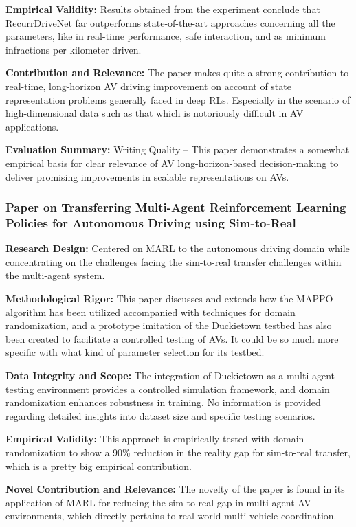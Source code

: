 \documentclass[lettersize,journal]{IEEEtran}
\begin{document}
\textbf{Empirical Validity:} Results obtained from the experiment conclude that RecurrDriveNet far outperforms state-of-the-art approaches concerning all the parameters, like in real-time performance, safe interaction, and as minimum infractions per kilometer driven.

\textbf{Contribution and Relevance:} The paper makes quite a strong contribution to real-time, long-horizon AV driving improvement on account of state representation problems generally faced in deep RLs. Especially in the scenario of high-dimensional data such as that which is notoriously difficult in AV applications.

\textbf{Evaluation Summary:} Writing Quality – This paper demonstrates a somewhat empirical basis for clear relevance of AV long-horizon-based decision-making to deliver promising improvements in scalable representations on AVs.

\subsubsection{Paper on Transferring Multi-Agent Reinforcement Learning Policies for Autonomous Driving using Sim-to-Real
\cite{ref60}}

\textbf{Research Design:} Centered on MARL to the autonomous driving domain while concentrating on the challenges facing the sim-to-real transfer challenges within the multi-agent system.

\textbf{Methodological Rigor:} This paper discusses and extends how the MAPPO algorithm has been utilized accompanied with techniques for domain randomization, and a prototype imitation of the Duckietown testbed has also been created to facilitate a controlled testing of AVs. It could be so much more specific with what kind of parameter selection for its testbed.

\textbf{Data Integrity and Scope:} The integration of Duckietown as a multi-agent testing environment provides a controlled simulation framework, and domain randomization enhances robustness in training. No information is provided regarding detailed insights into dataset size and specific testing scenarios.

\textbf{Empirical Validity:} This approach is empirically tested with domain randomization to show a 90\% reduction in the reality gap for sim-to-real transfer, which is a pretty big empirical contribution.

\textbf{Novel Contribution and Relevance:} The novelty of the paper is found in its application of MARL for reducing the sim-to-real gap in multi-agent AV environments, which directly pertains to real-world multi-vehicle coordination.
\end{document}
